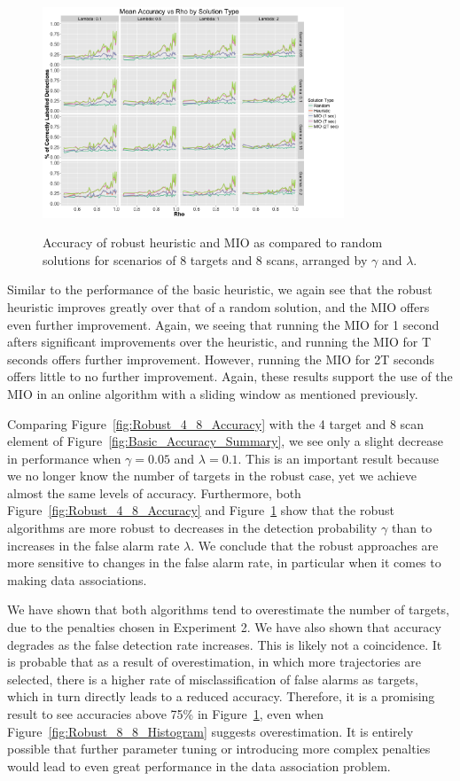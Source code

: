 \documentclass[journal]{IEEEtran}
\begin{document}
\begin{figure}[h]
  \centering
  \includegraphics[width=9cm, height=7cm]{8_8_Accuracy}
  \caption{Accuracy of robust heuristic and MIO as compared to random solutions for scenarios of 8 targets and 8 scans, arranged by $\gamma$ and $\lambda$.}
  \label{fig:Robust_8_8_Accuracy}
\end{figure}

Similar to the performance of the basic heuristic, we again see that the robust heuristic improves greatly over that of a random solution, and the MIO offers even further improvement. Again, we seeing that running the MIO for 1 second afters significant improvements over the heuristic, and running the MIO for T seconds offers further improvement. However, running the MIO for 2T seconds offers little to no further improvement. Again, these results support the use of the MIO in an online algorithm with a sliding window as mentioned previously. 

Comparing Figure~\ref{fig:Robust_4_8_Accuracy} with the 4 target and 8 scan element of Figure~\ref{fig:Basic_Accuracy_Summary}, we see only a slight decrease in performance when $\gamma = 0.05$ and $\lambda=0.1$. This is an important result because we no longer know the number of targets in the robust case, yet we achieve almost the same levels of accuracy. Furthermore, both Figure~\ref{fig:Robust_4_8_Accuracy} and Figure~\ref{fig:Robust_8_8_Accuracy} show that the robust algorithms are more robust to decreases in the detection probability $\gamma$ than to increases in the false alarm rate $\lambda$. We conclude that the robust approaches are more sensitive to changes in the false alarm rate, in particular when it comes to making data associations. 

We have shown that both algorithms tend to overestimate the number of targets, due to the penalties chosen in Experiment 2. We have also shown that accuracy degrades as the false detection rate increases. This is likely not a coincidence. It is probable that as a result of overestimation, in which more trajectories are selected, there is a higher rate of misclassification of false alarms as targets, which in turn directly leads to a reduced accuracy. Therefore, it is a promising result to see accuracies above 75\% in Figure~\ref{fig:Robust_8_8_Accuracy}, even when Figure~\ref{fig:Robust_8_8_Histogram} suggests overestimation. It is entirely possible that further parameter tuning or introducing more complex penalties would lead to even great performance in the data association problem.
\end{document}
